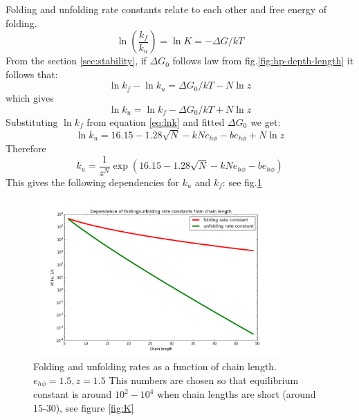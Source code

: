 \documentclass[12pt]{paper}
\newcommand{\gD}{\Delta}
\newcommand{\pt}[1]{\left( #1\right)}
\begin{document}
Folding and unfolding rate constants relate to each other and free energy of folding.
\begin{equation}
 \ln\pt{\frac{k_f}{k_u}}=\ln K=-\gD G/kT
\end{equation} 
From the section \ref{sec:stability}, if $\gD G_0$ follows law from fig.\ref{fig:hp-depth-length}  
it follows that:
\begin{equation}
\ln k_f-\ln k_u=\gD G_0/kT-N\ln z%
\end{equation} 
which gives
\begin{equation}
\ln k_u = \ln k_f -\gD G_0/kT+N\ln z 
\end{equation} 
Substituting $\ln k_f $ from equation \eqref{eq:lnk} and fitted $\gD G_0$ we get:
\begin{equation}
\ln k_u = 16.15-1.28 \sqrt{N} -kNe_{h\phi} -be_{h\phi}+N\ln z
\end{equation} 
Therefore
\begin{equation}\label{eq:ku_2d}
k_u = \frac{1}{z^N}\exp(16.15-1.28 \sqrt{N} -kNe_{h\phi} -be_{h\phi})
\end{equation} 
This gives the following dependencies for $k_u$ and $k_f$: see fig.\ref{fig:k_unf_N}
\begin{figure}[h!]
  \centering
  \includegraphics[width=0.85\textwidth]{pictures/kf-ku.png} 
  \caption{Folding and unfolding rates as a function of chain length. $e_{h\phi}=1.5,z=1.5$ This 
numbers 
are chosen so that equilibrium constant is around $10^2-10^4$ when chain lengths are short (around 
15-30), see figure \ref{fig:K}}
  \label{fig:k_unf_N}
\end{figure}
\end{document}
